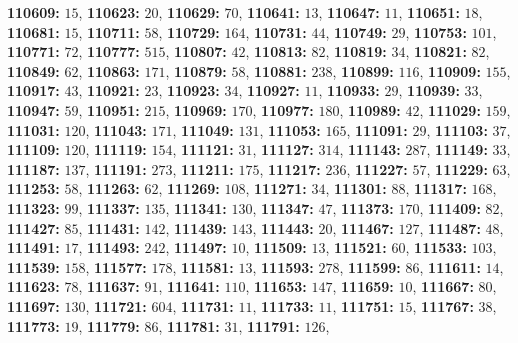 \textsf{\bfseries 110609:} $15$, \textsf{\bfseries 110623:} $20$, \textsf{\bfseries 110629:} $70$, \textsf{\bfseries 110641:} $13$, \textsf{\bfseries 110647:} $11$, \textsf{\bfseries 110651:} $18$, \textsf{\bfseries 110681:} $15$, \textsf{\bfseries 110711:} $58$, \textsf{\bfseries 110729:} $164$, \textsf{\bfseries 110731:} $44$, \textsf{\bfseries 110749:} $29$, \textsf{\bfseries 110753:} $101$, \textsf{\bfseries 110771:} $72$, \textsf{\bfseries 110777:} $515$, \textsf{\bfseries 110807:} $42$, \textsf{\bfseries 110813:} $82$, \textsf{\bfseries 110819:} $34$, \textsf{\bfseries 110821:} $82$, \textsf{\bfseries 110849:} $62$, \textsf{\bfseries 110863:} $171$, \textsf{\bfseries 110879:} $58$, \textsf{\bfseries 110881:} $238$, \textsf{\bfseries 110899:} $116$, \textsf{\bfseries 110909:} $155$, \textsf{\bfseries 110917:} $43$, \textsf{\bfseries 110921:} $23$, \textsf{\bfseries 110923:} $34$, \textsf{\bfseries 110927:} $11$, \textsf{\bfseries 110933:} $29$, \textsf{\bfseries 110939:} $33$, \textsf{\bfseries 110947:} $59$, \textsf{\bfseries 110951:} $215$, \textsf{\bfseries 110969:} $170$, \textsf{\bfseries 110977:} $180$, \textsf{\bfseries 110989:} $42$, \textsf{\bfseries 111029:} $159$, \textsf{\bfseries 111031:} $120$, \textsf{\bfseries 111043:} $171$, \textsf{\bfseries 111049:} $131$, \textsf{\bfseries 111053:} $165$, \textsf{\bfseries 111091:} $29$, \textsf{\bfseries 111103:} $37$, \textsf{\bfseries 111109:} $120$, \textsf{\bfseries 111119:} $154$, \textsf{\bfseries 111121:} $31$, \textsf{\bfseries 111127:} $314$, \textsf{\bfseries 111143:} $287$, \textsf{\bfseries 111149:} $33$, \textsf{\bfseries 111187:} $137$, \textsf{\bfseries 111191:} $273$, \textsf{\bfseries 111211:} $175$, \textsf{\bfseries 111217:} $236$, \textsf{\bfseries 111227:} $57$, \textsf{\bfseries 111229:} $63$, \textsf{\bfseries 111253:} $58$, \textsf{\bfseries 111263:} $62$, \textsf{\bfseries 111269:} $108$, \textsf{\bfseries 111271:} $34$, \textsf{\bfseries 111301:} $88$, \textsf{\bfseries 111317:} $168$, \textsf{\bfseries 111323:} $99$, \textsf{\bfseries 111337:} $135$, \textsf{\bfseries 111341:} $130$, \textsf{\bfseries 111347:} $47$, \textsf{\bfseries 111373:} $170$, \textsf{\bfseries 111409:} $82$, \textsf{\bfseries 111427:} $85$, \textsf{\bfseries 111431:} $142$, \textsf{\bfseries 111439:} $143$, \textsf{\bfseries 111443:} $20$, \textsf{\bfseries 111467:} $127$, \textsf{\bfseries 111487:} $48$, \textsf{\bfseries 111491:} $17$, \textsf{\bfseries 111493:} $242$, \textsf{\bfseries 111497:} $10$, \textsf{\bfseries 111509:} $13$, \textsf{\bfseries 111521:} $60$, \textsf{\bfseries 111533:} $103$, \textsf{\bfseries 111539:} $158$, \textsf{\bfseries 111577:} $178$, \textsf{\bfseries 111581:} $13$, \textsf{\bfseries 111593:} $278$, \textsf{\bfseries 111599:} $86$, \textsf{\bfseries 111611:} $14$, \textsf{\bfseries 111623:} $78$, \textsf{\bfseries 111637:} $91$, \textsf{\bfseries 111641:} $110$, \textsf{\bfseries 111653:} $147$, \textsf{\bfseries 111659:} $10$, \textsf{\bfseries 111667:} $80$, \textsf{\bfseries 111697:} $130$, \textsf{\bfseries 111721:} $604$, \textsf{\bfseries 111731:} $11$, \textsf{\bfseries 111733:} $11$, \textsf{\bfseries 111751:} $15$, \textsf{\bfseries 111767:} $38$, \textsf{\bfseries 111773:} $19$, \textsf{\bfseries 111779:} $86$, \textsf{\bfseries 111781:} $31$, \textsf{\bfseries 111791:} $126$, 
